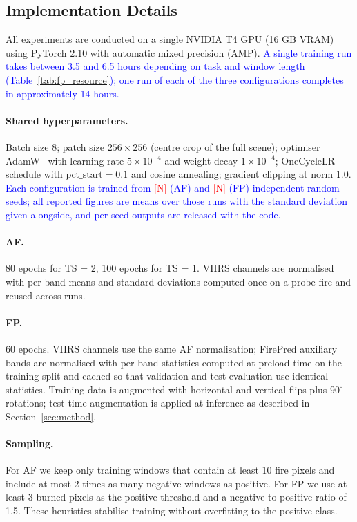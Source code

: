 \documentclass[sensors,article,submit,moreauthors,pdftex]{Definitions/mdpi}
\newcommand{\rev}[1]{\textcolor{blue}{#1}}
\newcommand{\nseedAF}{\textcolor{red}{[N]}}
\newcommand{\nseedFP}{\textcolor{red}{[N]}}
\begin{document}
\subsection{Implementation Details}

All experiments are conducted on a single NVIDIA T4 GPU (16 GB VRAM) using PyTorch 2.10 with automatic mixed precision (AMP). \rev{A single training run takes between 3.5 and 6.5 hours depending on task and window length (Table~\ref{tab:fp_resource}); one run of each of the three configurations completes in approximately 14 hours.}

\paragraph*{Shared hyperparameters.} Batch size 8; patch size $256 \times 256$ (centre crop of the full scene); optimiser AdamW~\cite{kingma2015adam,loshchilov2019decoupled} with learning rate $5 \times 10^{-4}$ and weight decay $1 \times 10^{-4}$; OneCycleLR~\cite{smith2019super} schedule with $\mathrm{pct\_start} = 0.1$ and cosine annealing; gradient clipping at norm 1.0. \rev{Each configuration is trained from
\nseedAF{} (AF) and \nseedFP{} (FP) independent random seeds; all reported
figures are means over those runs with the standard deviation given alongside,
and per-seed outputs are released with the code.}

\paragraph*{AF.} 80 epochs for TS = 2, 100 epochs for TS = 1. VIIRS channels are normalised with per-band means and standard deviations computed once on a probe fire and reused across runs.

\paragraph*{FP.} 60 epochs. VIIRS channels use the same AF normalisation; FirePred auxiliary bands are normalised with per-band statistics computed at preload time on the training split and cached so that validation and test evaluation use identical statistics. Training data is augmented with horizontal and vertical flips plus $90^\circ$ rotations; test-time augmentation is applied at inference as described in Section~\ref{sec:method}.

\paragraph*{Sampling.} For AF we keep only training windows that contain at least 10 fire pixels and include at most 2 times as many negative windows as positive. For FP we use at least 3 burned pixels as the positive threshold and a negative-to-positive ratio of 1.5. These heuristics stabilise training without overfitting to the positive class.
\end{document}
